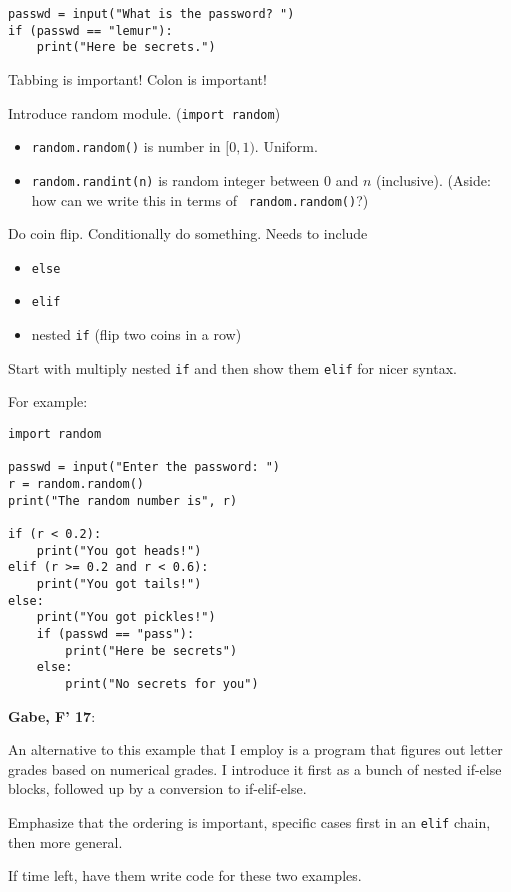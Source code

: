 \documentclass{article}
\newenvironment{reflect}[1]
{
  \noindent
  \begin{lrbox}{\reflectbox}
    \begin{minipage}[t]{\textwidth}
      \textbf{#1}:
}{
    \end{minipage}
  \end{lrbox}
  \fbox{\usebox{\reflectbox}}
}
\begin{document}
\begin{verbatim}
passwd = input("What is the password? ")
if (passwd == "lemur"):
    print("Here be secrets.")
\end{verbatim}

Tabbing is important!  Colon is important!

Introduce random module. ({\tt import random})
\begin{itemize}
\item {\tt random.random()} is number in $[0,1)$. Uniform.
\item {\tt random.randint(n)} is random integer between $0$ and $n$
  (inclusive).  (Aside: how can we write this in terms of {\tt
    random.random()}?)
\end{itemize}
Do coin flip.  Conditionally do something.  Needs to include
\begin{itemize}
\item {\tt else}
\item {\tt elif}
\item nested {\tt if}  (flip two coins in a row)
\end{itemize}

Start with multiply nested {\tt if} and then show them {\tt elif} for
nicer syntax.

For example:
\begin{verbatim}
import random

passwd = input("Enter the password: ")
r = random.random()
print("The random number is", r)

if (r < 0.2):
    print("You got heads!")
elif (r >= 0.2 and r < 0.6):
    print("You got tails!")
else:
    print("You got pickles!")
    if (passwd == "pass"):
        print("Here be secrets")
    else:
        print("No secrets for you")
\end{verbatim}

\begin{reflect}{Gabe, F' 17}
An alternative to this example that I employ is a program that figures out letter grades based on numerical grades. I introduce it first as a bunch of nested if-else blocks, followed up by a conversion to if-elif-else.
\end{reflect}

Emphasize that the ordering is important, specific cases first in an {\tt elif} chain, then more general.

If time left, have them write code for these two examples.
\end{document}
